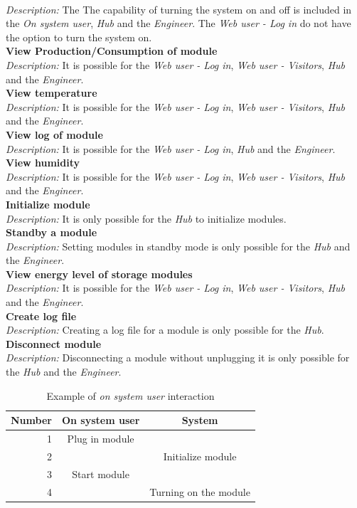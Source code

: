 		\\\textit{Description: }
		The The capability of turning the system on and off is included in the \textit{On system user}, \textit{Hub} and the \textit{Engineer}. The \textit{Web user - Log in} do not have the option to turn the system on.
		\\\textbf{View Production/Consumption of module}
		\\\textit{Description: }
		It is possible for the \textit{Web user - Log in}, \textit{Web user - Visitors}, \textit{Hub} and the \textit{Engineer}.
		\\\textbf{View temperature}
		\\\textit{Description: }
		It is possible for the \textit{Web user - Log in}, \textit{Web user - Visitors}, \textit{Hub} and the \textit{Engineer}.
		\\\textbf{View log of module}
		\\\textit{Description: }
		It is possible for the \textit{Web user - Log in}, \textit{Hub} and the \textit{Engineer}.
		\\\textbf{View humidity}
		\\\textit{Description: }
		It is possible for the \textit{Web user - Log in}, \textit{Web user - Visitors}, \textit{Hub} and the \textit{Engineer}.
		\\\textbf{Initialize module}
		\\\textit{Description: }
		It is only possible for the \textit{Hub} to initialize modules.
		\\\textbf{Standby a module}
		\\\textit{Description: }
		Setting modules in standby mode is only possible for the \textit{Hub} and the \textit{Engineer}.
		\\\textbf{View energy level of storage modules}
		\\\textit{Description: }
		It is possible for the \textit{Web user - Log in}, \textit{Web user - Visitors}, \textit{Hub} and the \textit{Engineer}.
		\\\textbf{Create log file}
		\\\textit{Description: }
		Creating a log file for a module is only possible for the \textit{Hub}.
		\\\textbf{Disconnect module}
		\\\textit{Description: }
		Disconnecting a module without unplugging it is only possible for the \textit{Hub} and the \textit{Engineer}.
		\\\begin{table}[h!]
					\begin{tabular}{| r | c | c |}
					\hline
					Number	& On system user	& System \\ \hline
					1		& Plug in module	& ~ \\ \hline
					2		& ~					& Initialize module \\ \hline
					3		& Start module		& ~ \\ \hline
					4		& ~					& Turning on the module \\ \hline
					\end{tabular}
					\caption{Example of \textit{on system user} interaction}
				\end{table}

